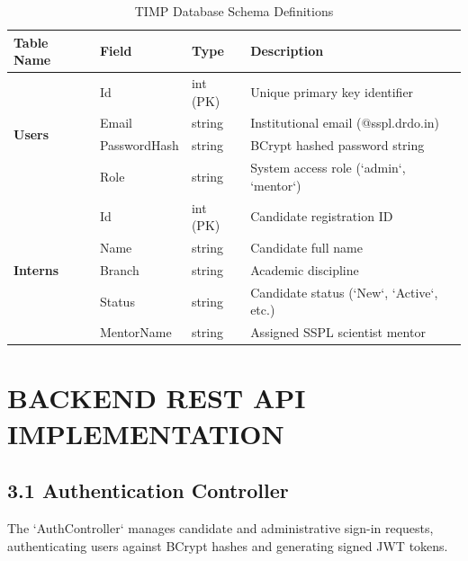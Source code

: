 \documentclass[12pt,a4paper]{article}
\begin{document}
\begin{table}[htbp]
\centering
\caption{TIMP Database Schema Definitions}
\small
\renewcommand{\arraystretch}{1.5}
\begin{tabular}{|l|l|l|l|}
\hline
\textbf{Table Name} & \textbf{Field} & \textbf{Type} & \textbf{Description} \\ \hline
\multirow{4}{*}{\textbf{Users}} 
 & Id & int (PK) & Unique primary key identifier \\ \cline{2-4}
 & Email & string & Institutional email (@sspl.drdo.in) \\ \cline{2-4}
 & PasswordHash & string & BCrypt hashed password string \\ \cline{2-4}
 & Role & string & System access role (`admin`, `mentor`) \\ \hline
\multirow{5}{*}{\textbf{Interns}} 
 & Id & int (PK) & Candidate registration ID \\ \cline{2-4}
 & Name & string & Candidate full name \\ \cline{2-4}
 & Branch & string & Academic discipline \\ \cline{2-4}
 & Status & string & Candidate status (`New`, `Active`, etc.) \\ \cline{2-4}
 & MentorName & string & Assigned SSPL scientist mentor \\ \hline
\end{tabular}
\end{table}

\newpage
\section{BACKEND REST API IMPLEMENTATION}

\subsection{3.1 Authentication Controller}
The `AuthController` manages candidate and administrative sign-in requests, authenticating users against BCrypt hashes and generating signed JWT tokens.
\end{document}
